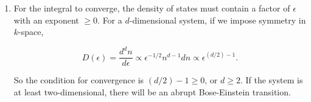 \documentclass{article}
\begin{document}
\begin{enumerate}
\begin{enumerate}
		\item

		For the integral to converge, the density of states must contain a factor of $\epsilon$ with an exponent $\geq 0$. For a $d$-dimensional system, if we impose symmetry in $k$-space,

		$$D(\epsilon) = \frac{d^dn}{d\epsilon} \propto \epsilon^{-1/2} n^{d-1} dn \propto \epsilon^{(d/2) - 1}.$$

		So the condition for convergence is $(d/2) - 1 \geq 0$, or $d \geq 2$. If the system is at least two-dimensional, there will be an abrupt Bose-Einstein transition.

	\end{enumerate}

\end{enumerate}
\end{document}
